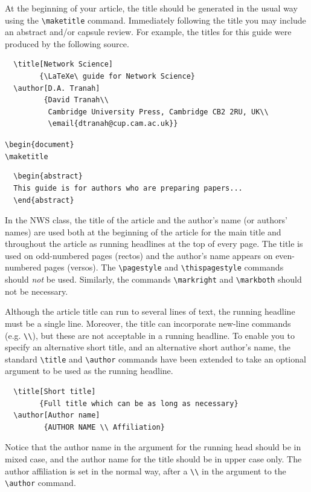 \documentclass{article}
\begin{document}
At the beginning of your article, the title should be generated in the
usual way using the \verb"\maketitle" command. Immediately following the
title you may include an abstract and/or capsule review. For example, the titles
for this guide were produced by the following source.
%
\begin{verbatim}
  \title[Network Science]
        {\LaTeXe\ guide for Network Science}
  \author[D.A. Tranah]
         {David Tranah\\
          Cambridge University Press, Cambridge CB2 2RU, UK\\
          \email{dtranah@cup.cam.ac.uk}}
\end{verbatim}

\verb"\begin{document}"\\
\indent\verb"\maketitle"

\begin{verbatim}
  \begin{abstract}
  This guide is for authors who are preparing papers...
  \end{abstract}
\end{verbatim}

In the NWS class, the title of the article and the author's name (or
authors' names) are used both at the beginning of the article for the main
title and throughout the article as running headlines at the top of every
page. The title is used on odd-numbered pages (rectos) and the author's name
appears on even-numbered pages (versos). The \verb"\pagestyle" and
\verb"\thispagestyle" commands should \emph{not} be used.  Similarly, the
commands \verb"\markright" and \verb"\markboth" should not be necessary.

Although the article title can run to several lines of text, the running
headline must be a single line. Moreover, the title can incorporate new-line
commands (e.g. \verb"\\"), but these are not acceptable in a running headline.
To enable you to specify an alternative short title, and an alternative short
author's name, the standard \verb"\title" and \verb"\author" commands have
been extended to take an optional argument to be used as the running headline.
%
\begin{verbatim}
  \title[Short title]
        {Full title which can be as long as necessary}
  \author[Author name]
         {AUTHOR NAME \\ Affiliation}
\end{verbatim}
%
Notice that the author name in the argument for the running head should
be in mixed case, and the author name for the title should be in upper
case only. The author affiliation is set in the normal way, after a
\verb"\\" in the argument to the \verb"\author" command.
\end{document}
